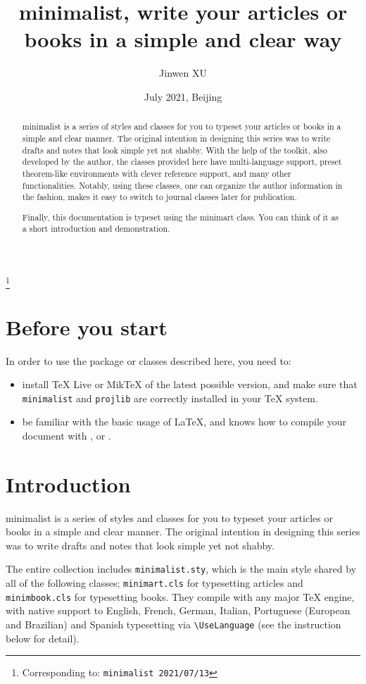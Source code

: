 \documentclass[English,Chinese,French,puretext]{minimart}
\providecommand{\minimalist}{\textsf{minimalist}}
\providecommand{\minimart}{\textsf{minimart}}
\let\LevelOneTitle\section
\begin{document}
\title{\minimalist{}, write your articles or books in a simple and clear way}
\author{Jinwen XU}
\thanks{Corresponding to: \texttt{\minimalist{} 2021/07/13}}
\date{July 2021, Beijing}

\maketitle

\begin{abstract}
    \minimalist{} is a series of styles and classes for you to typeset your articles or books in a simple and clear manner. The original intention in designing this series was to write drafts and notes that look simple yet not shabby. With the help of the \ProjLib{} toolkit, also developed by the author, the classes provided here have multi-language support, preset theorem-like environments with clever reference support, and many other functionalities. Notably, using these classes, one can organize the author information in the \AmS{} fashion, makes it easy to switch to journal classes later for publication.

    Finally, this documentation is typeset using the \minimart{} class. You can think of it as a short introduction and demonstration.
\end{abstract}


\setcounter{tocdepth}{2}
\tableofcontents


\medskip
\LevelOneTitle*{Before you start}
In order to use the package or classes described here, you need to:
\begin{itemize}
    \item install TeX Live or MikTeX of the latest possible version, and make sure that \texttt{minimalist} and \texttt{projlib} are correctly installed in your \TeX{} system.
    \item be familiar with the basic usage of \LaTeX{}, and knows how to compile your document with ,  or .
\end{itemize}

\LevelOneTitle{Introduction}

\minimalist{} is a series of styles and classes for you to typeset your articles or books in a simple and clear manner. The original intention in designing this series was to write drafts and notes that look simple yet not shabby.

The entire collection includes \verb|minimalist.sty|, which is the main style shared by all of the following classes; \verb|minimart.cls| for typesetting articles and \verb|minimbook.cls| for typesetting books. They compile with any major \TeX{} engine, with native support to English, French, German, Italian, Portuguese (European and Brazilian) and Spanish typesetting via \lstinline|\UseLanguage| (see the instruction below for detail).
\end{document}
